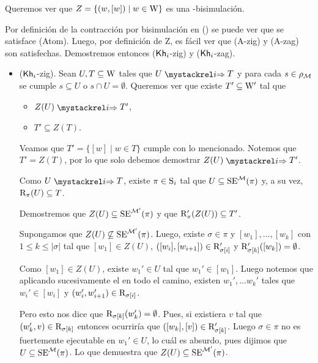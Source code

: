 \begin{demostracion}
    Queremos ver que $Z = \{(w,[w]) \mid w \in \W\}$ es una \KHilogic-bisimulación.
    
    Por definición de la contracción por bisimulación en (\bml) se puede ver que se satisface (Atom). 
    Luego, por definición de Z, es fácil ver que (A-zig) y (A-zag) son satisfechas. Demostremos entonces ($\khi$-zig) y ($\khi$-zag).

    \begin{itemize}
        \item ($\khi$-zig). Sean $U, T \subseteq \W$ tales que $U \ultsExecAgi T$ y para cada $s \in \rho_\modults$ se cumple 
        $s \subseteq U$ o $s \cap U = \emptyset$. Queremos ver que existe $T' \subseteq \W'$ tal que

        \begin{multicols}{2}
            \begin{itemize}
                \item $Z(U) \ultsExecAgi T'$, 
                \item $T' \subseteq Z(T)$.
            \end{itemize}
        \end{multicols}
        Veamos que $T' = \{[w] \mid w \in T\}$ cumple con lo mencionado. Notemos que $T' = Z(T)$, por lo que solo debemos demostrar 
        $Z(U) \ultsExecAgi T'$.

        Como $U \ultsExecAgi T$, existe $\pi \in \S_i$ tal que $U \subseteq \sexec^{\model}(\pi)$ y, a su vez, $\R_\pi(U) \subseteq T$.

        Demostremos que $Z(U) \subseteq \sexec^{\model'}(\pi)$ y que $\R'_\pi(Z(U)) \subseteq T'$.

        Supongamos que $Z(U) \not\subseteq\sexec^{\model'}(\pi)$. Luego, existe $\sigma \in \pi$ y $[w_1],...,[w_k]$ 
        con $1 \le k \le |\sigma|$ tal que $[w_1] \in Z(U)$, $([w_i], [w_{i+1}]) \in \R'_{\sigma[i]}$ y 
        $\R'_{\sigma[k]}([w_k]) = \emptyset$.

        Como $[w_1] \in Z(U)$, existe $w_1' \in U$ tal que $w_1' \in [w_1]$. Luego notemos que aplicando sucesivamente el 
         en todo el camino, existen $w_1',...w_k'$ tales que $w_i' \in [w_i]$ y 
        $(w_i',w_{i+1}') \in \R_{\sigma[i]}$.

        Pero esto nos dice que $\R_{\sigma[k]}(w_k') = \emptyset$. Pues, si existiera $v$ tal que 
        $(w_k',v) \in \R_{\sigma[k]}$ entonces ocurriría que $([w_k],[v]) \in \R'_{\sigma[k]}$. Luego $\sigma \in \pi$ no es 
        fuertemente ejecutable en $w_1' \in U$, lo cuál es absurdo, pues dijimos que $U \subseteq \sexec^{\model}(\pi)$. Lo que 
        demuestra que $Z(U) \subseteq \sexec^{\model'}(\pi)$.


\end{itemize}
\end{demostracion}
